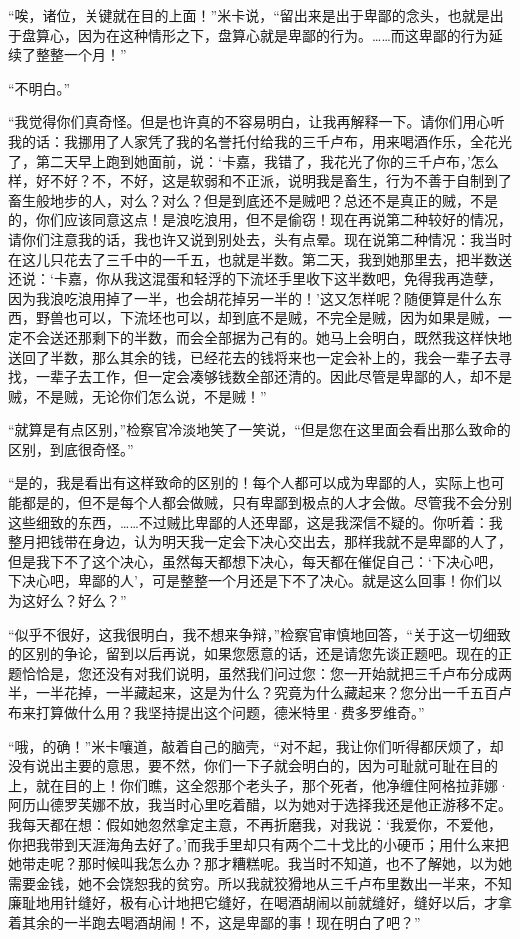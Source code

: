 \par “唉，诸位，关键就在目的上面！”米卡说，“留出来是出于卑鄙的念头，也就是出于盘算心，因为在这种情形之下，盘算心就是卑鄙的行为。……而这卑鄙的行为延续了整整一个月！”
\par “不明白。”
\par “我觉得你们真奇怪。但是也许真的不容易明白，让我再解释一下。请你们用心听我的话：我挪用了人家凭了我的名誉托付给我的三千卢布，用来喝酒作乐，全花光了，第二天早上跑到她面前，说：‘卡嘉，我错了，我花光了你的三千卢布，’怎么样，好不好？不，不好，这是软弱和不正派，说明我是畜生，行为不善于自制到了畜生般地步的人，对么？对么？但是到底还不是贼吧？总还不是真正的贼，不是的，你们应该同意这点！是浪吃浪用，但不是偷窃！现在再说第二种较好的情况，请你们注意我的话，我也许又说到别处去，头有点晕。现在说第二种情况：我当时在这儿只花去了三千中的一千五，也就是半数。第二天，我到她那里去，把半数送还说：‘卡嘉，你从我这混蛋和轻浮的下流坯手里收下这半数吧，免得我再造孽，因为我浪吃浪用掉了一半，也会胡花掉另一半的！’这又怎样呢？随便算是什么东西，野兽也可以，下流坯也可以，却到底不是贼，不完全是贼，因为如果是贼，一定不会送还那剩下的半数，而会全部据为己有的。她马上会明白，既然我这样快地送回了半数，那么其余的钱，已经花去的钱将来也一定会补上的，我会一辈子去寻找，一辈子去工作，但一定会凑够钱数全部还清的。因此尽管是卑鄙的人，却不是贼，不是贼，无论你们怎么说，不是贼！”
\par “就算是有点区别，”检察官冷淡地笑了一笑说，“但是您在这里面会看出那么致命的区别，到底很奇怪。”
\par “是的，我是看出有这样致命的区别的！每个人都可以成为卑鄙的人，实际上也可能都是的，但不是每个人都会做贼，只有卑鄙到极点的人才会做。尽管我不会分别这些细致的东西，……不过贼比卑鄙的人还卑鄙，这是我深信不疑的。你听着：我整月把钱带在身边，认为明天我一定会下决心交出去，那样我就不是卑鄙的人了，但是我下不了这个决心，虽然每天都想下决心，每天都在催促自己：‘下决心吧，下决心吧，卑鄙的人’，可是整整一个月还是下不了决心。就是这么回事！你们以为这好么？好么？”
\par “似乎不很好，这我很明白，我不想来争辩，”检察官审慎地回答，“关于这一切细致的区别的争论，留到以后再说，如果您愿意的话，还是请您先谈正题吧。现在的正题恰恰是，您还没有对我们说明，虽然我们问过您：您一开始就把三千卢布分成两半，一半花掉，一半藏起来，这是为什么？究竟为什么藏起来？您分出一千五百卢布来打算做什么用？我坚持提出这个问题，德米特里·费多罗维奇。”
\par “哦，的确！”米卡嚷道，敲着自己的脑壳，“对不起，我让你们听得都厌烦了，却没有说出主要的意思，要不然，你们一下子就会明白的，因为可耻就可耻在目的上，就在目的上！你们瞧，这全怨那个老头子，那个死者，他净缠住阿格拉菲娜·阿历山德罗芙娜不放，我当时心里吃着醋，以为她对于选择我还是他正游移不定。我每天都在想：假如她忽然拿定主意，不再折磨我，对我说：‘我爱你，不爱他，你把我带到天涯海角去好了。’而我手里却只有两个二十戈比的小硬币；用什么来把她带走呢？那时候叫我怎么办？那才糟糕呢。我当时不知道，也不了解她，以为她需要金钱，她不会饶恕我的贫穷。所以我就狡猾地从三千卢布里数出一半来，不知廉耻地用针缝好，极有心计地把它缝好，在喝酒胡闹以前就缝好，缝好以后，才拿着其余的一半跑去喝酒胡闹！不，这是卑鄙的事！现在明白了吧？”
